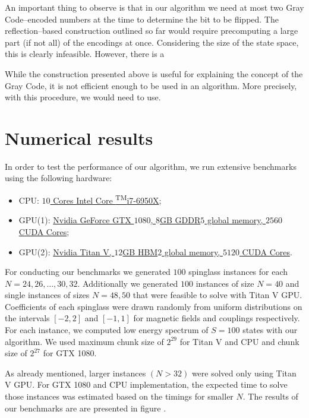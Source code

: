 An important thing to observe is that in our algorithm we need at most two Gray Code--encoded numbers at the time to determine the bit to be flipped. The reflection--based construction outlined so far would require precomputing a large part (if not all) of the encodings at once. Considering the size of the state space, this is clearly infeasible. However, there is a

While the construction presented above is useful for explaining the concept of the Gray Code, it is not efficient enough to be used in an algorithm. More precisely, with this procedure, we would need to use.

\section{Numerical results}
In order to test the performance of our algorithm, we run extensive benchmarks using the following hardware:
%
\begin{itemize}
\item CPU:
\href{https://ark.intel.com/products/94456/Intel-Core-i7-6950X-Processor-Extreme-Edition-25M-Cache-up-to-3-50-GHz-}{$10$
Cores {\rmfamily Intel\textregistered} Core \textsuperscript{TM}i7-6950X};
%
\item GPU(1): \href{https://www.nvidia.com/en-us/geforce/products/10series/geforce-gtx-1080}{Nvidia GeForce GTX $1080$, $8$GB GDDR$5$ global memory, $2560$ CUDA Cores};
%
\item  GPU(2): \href{https://www.nvidia.com/en-us/titan/titan-v/}{Nvidia Titan V, $12$GB HBM$2$ global memory, $5120$ CUDA Cores}.
\end{itemize}

For conducting our benchmarks we generated $100$ spinglass instances for each $N=24, 26, \ldots, 30, 32$. Additionally we generated $100$ instances of size $N=40$ and single instances of sizes $N=48, 50$ that were feasible to solve with Titan V GPU. Coefficients of each spinglass were drawn randomly from uniform distributions on the intervals $[-2, 2]$ and $[-1, 1]$ for magnetic fields and couplings respectively. For each instance, we computed low energy spectrum of $S=100$ states with our algorithm. We used maximum chunk size of $2^{29}$ for Titan V and CPU and chunk size of $2^{27}$ for GTX 1080.

As already mentioned, larger instances $(N > 32)$ were solved only using Titan V GPU. For GTX 1080 and CPU implementation, the expected time to solve those instances was estimated based on the timings for smaller $N$. The results of our benchmarks are are presented in figure .

